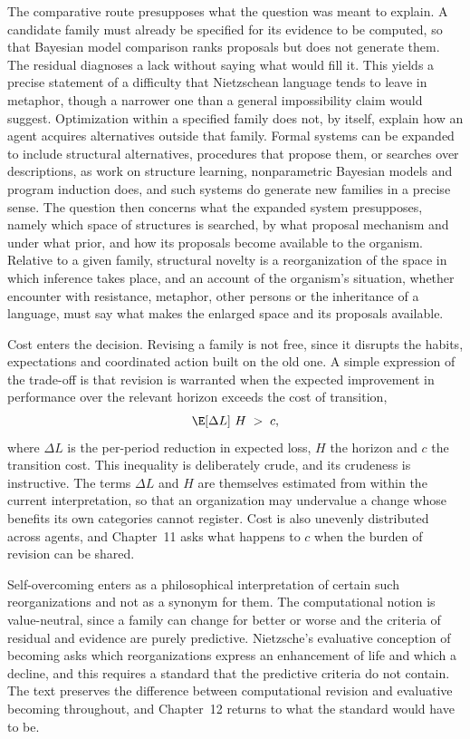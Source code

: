 The comparative route presupposes what the question was meant to explain. A candidate family must already be specified for its evidence to be computed, so that Bayesian model comparison ranks proposals but does not generate them. The residual diagnoses a lack without saying what would fill it. This yields a precise statement of a difficulty that Nietzschean language tends to leave in metaphor, though a narrower one than a general impossibility claim would suggest. Optimization within a specified family does not, by itself, explain how an agent acquires alternatives outside that family. Formal systems can be expanded to include structural alternatives, procedures that propose them, or searches over descriptions, as work on structure learning, nonparametric Bayesian models and program induction does, and such systems do generate new families in a precise sense. The question then concerns what the expanded system presupposes, namely which space of structures is searched, by what proposal mechanism and under what prior, and how its proposals become available to the organism. Relative to a given family, structural novelty is a reorganization of the space in which inference takes place, and an account of the organism's situation, whether encounter with resistance, metaphor, other persons or the inheritance of a language, must say what makes the enlarged space and its proposals available.

Cost enters the decision. Revising a family is not free, since it disrupts the habits, expectations and coordinated action built on the old one. A simple expression of the trade-off is that revision is warranted when the expected improvement in performance over the relevant horizon exceeds the cost of transition,
\[
\E\!\left[\Delta L\right]\,H \;>\; c ,
\]
where $\Delta L$ is the per-period reduction in expected loss, $H$ the horizon and $c$ the transition cost. This inequality is deliberately crude, and its crudeness is instructive. The terms $\Delta L$ and $H$ are themselves estimated from within the current interpretation, so that an organization may undervalue a change whose benefits its own categories cannot register. Cost is also unevenly distributed across agents, and Chapter~11 asks what happens to $c$ when the burden of revision can be shared.

Self-overcoming enters as a philosophical interpretation of certain such reorganizations and not as a synonym for them. The computational notion is value-neutral, since a family can change for better or worse and the criteria of residual and evidence are purely predictive. Nietzsche's evaluative conception of becoming asks which reorganizations express an enhancement of life and which a decline, and this requires a standard that the predictive criteria do not contain. The text preserves the difference between computational revision and evaluative becoming throughout, and Chapter~12 returns to what the standard would have to be.

